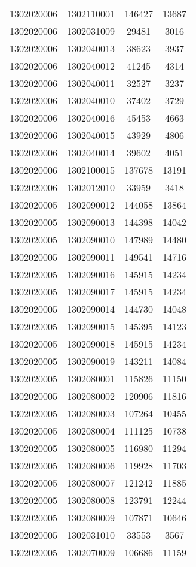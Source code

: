 \begin{longtable}{llcc}
1302020006 & 1302110001 & 146427 & 13687\\
1302020006 & 1302031009 & 29481 & 3016\\
1302020006 & 1302040013 & 38623 & 3937\\
1302020006 & 1302040012 & 41245 & 4314\\
1302020006 & 1302040011 & 32527 & 3237\\
1302020006 & 1302040010 & 37402 & 3729\\
1302020006 & 1302040016 & 45453 & 4663\\
1302020006 & 1302040015 & 43929 & 4806\\
1302020006 & 1302040014 & 39602 & 4051\\
1302020006 & 1302100015 & 137678 & 13191\\
1302020006 & 1302012010 & 33959 & 3418\\
1302020005 & 1302090012 & 144058 & 13864\\
1302020005 & 1302090013 & 144398 & 14042\\
1302020005 & 1302090010 & 147989 & 14480\\
1302020005 & 1302090011 & 149541 & 14716\\
1302020005 & 1302090016 & 145915 & 14234\\
1302020005 & 1302090017 & 145915 & 14234\\
1302020005 & 1302090014 & 144730 & 14048\\
1302020005 & 1302090015 & 145395 & 14123\\
1302020005 & 1302090018 & 145915 & 14234\\
1302020005 & 1302090019 & 143211 & 14084\\
1302020005 & 1302080001 & 115826 & 11150\\
1302020005 & 1302080002 & 120906 & 11816\\
1302020005 & 1302080003 & 107264 & 10455\\
1302020005 & 1302080004 & 111125 & 10738\\
1302020005 & 1302080005 & 116980 & 11294\\
1302020005 & 1302080006 & 119928 & 11703\\
1302020005 & 1302080007 & 121242 & 11885\\
1302020005 & 1302080008 & 123791 & 12244\\
1302020005 & 1302080009 & 107871 & 10646\\
1302020005 & 1302031010 & 33553 & 3567\\
1302020005 & 1302070009 & 106686 & 11159\\

\end{longtable}
